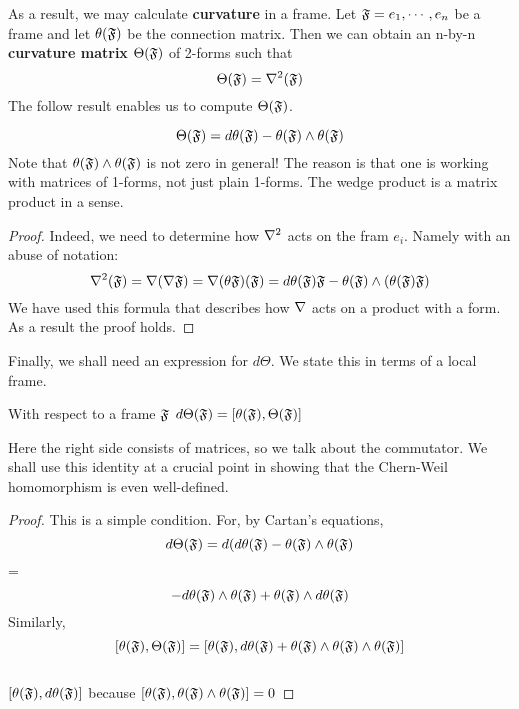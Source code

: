 As a result, we may calculate {\bf curvature} in a frame. Let $\mathfrak{F} = {e_1,\cdots,e_n}$ be a frame and let $\theta(\mathfrak{F})$
be the connection matrix. Then we can obtain an n-by-n {\bf curvature matrix} $\Theta(\mathfrak{F})$ of 2-forms such that
\\$$ \Theta(\mathfrak{F}) = \nabla^2(\mathfrak{F})$$
The follow result enables us to compute $\Theta(\mathfrak{F})$.
\begin{proposition}[Cartan]
\begin{equation}\Theta(\mathfrak{F})=d\theta(\mathfrak{F}) - \theta(\mathfrak{F})\wedge \theta(\mathfrak{F})\end{equation}
Note that $\theta(\mathfrak{F}) \wedge \theta(\mathfrak{F})$ is not zero in general! The reason is that one is working with matrices of 1-forms,
not just plain 1-forms. The wedge product is a matrix product in a sense.
\end{proposition}
\begin{proof}
 Indeed, we need to determine how $\nabla^2$ acts on the fram ${e_i}.$ Namely with an abuse of notation:
$$\nabla^2(\mathfrak{F})=\nabla(\nabla \mathfrak{F}) = \nabla (\theta \mathfrak{F})(\mathfrak{F}) = d \theta(\mathfrak{F})\mathfrak{F} - \theta(\mathfrak{F}) \wedge (\theta(\mathfrak{F})\mathfrak{F})$$
We have used this formula that describes how $\nabla$ acts on a product with a form. As a result the proof holds.\end{proof}
Finally, we shall need an expression for $d \Theta$. We state this in terms of a local frame.
\begin{proposition}
 With respect to a frame $\mathfrak{F}$
$d \Theta(\mathfrak{F}) = [\theta(\mathfrak{F}),\Theta(\mathfrak{F})]$

\end{proposition}
Here the right side consists of matrices, so we talk about the commutator. We shall use this identity at a crucial point in showing
that the Chern-Weil homomorphism is even well-defined.
\begin{proof}
 This is a simple condition. For, by Cartan's equations,
$$d\Theta(\mathfrak{F}) = d(d\theta(\mathfrak{F})- \theta(\mathfrak{F}) \wedge \theta(\mathfrak{F})$$
= $$-d\theta(\mathfrak{F})\wedge \theta(\mathfrak{F}) + \theta(\mathfrak{F}) \wedge d\theta(\mathfrak{F})$$
Similarly,
\\ $$[\theta(\mathfrak{F}),\Theta(\mathfrak{F})]=[\theta(\mathfrak{F}),d\theta(\mathfrak{F})+\theta(\mathfrak{F})\wedge \theta (\mathfrak{F}) \wedge \theta (\mathfrak{F})]$$
\\ $[\theta(\mathfrak{F}),d\theta (\mathfrak{F})]$ because $[\theta(\mathfrak{F}),\theta(\mathfrak{F})\wedge \theta(\mathfrak{F})] =0$
\end{proof}
